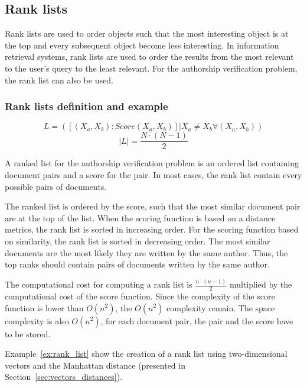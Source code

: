 \subsection{Rank lists}

Rank lists are used to order objects such that the most interesting object is at the top and every subsequent object become less interesting.
In information retrieval systems, rank lists are used to order the results from the most relevant to the user's query to the least relevant.
For the authorship verification problem, the rank list can also be used.

\subsubsection{Rank lists definition and example}

\begin{definition}
  \begin{equation}
    L = (\left[(X_a, X_b): Score(X_a, X_b)\right] | X_a \neq X_b \forall (X_a, X_b))
  \end{equation}
  \begin{equation}
    |L| = \frac{N \cdot (N - 1)}{2}
  \end{equation}
\end{definition}

A ranked list for the authorship verification problem is an ordered list containing document pairs and a score for the pair.
In most cases, the rank list contain every possible pairs of documents.

The ranked list is ordered by the score, such that the most similar document pair are at the top of the list.
When the scoring function is based on a distance metrics, the rank list is sorted in increasing order.
For the scoring function based on similarity, the rank list is sorted in decreasing order.
The most similar documents are the most likely they are written by the same author.
Thus, the top ranks should contain pairs of documents written by the same author.

The computational cost for computing a rank list is $\frac{n \cdot (n - 1)}{2}$ multiplied by the computational cost of the score function.
Since the complexity of the score function is lower than $O(n^2)$, the $O(n^2)$ complexity remain.
The space complexity is also $O(n^2)$, for each document pair, the pair and the score have to be stored.

Example~\ref{ex:rank_list} show the creation of a rank list using two-dimensional vectors and the Manhattan distance (presented in Section~\ref{sec:vectors_distances}).

